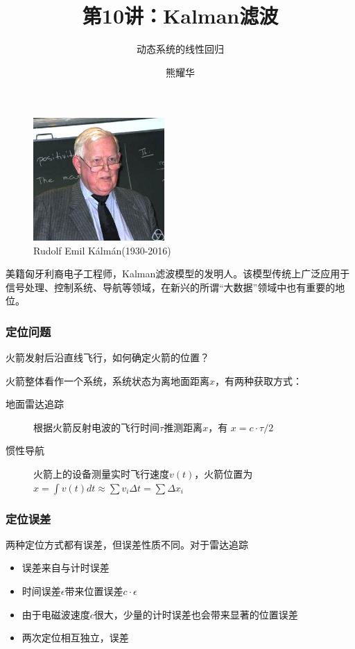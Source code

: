 \documentclass[14pt]{beamer}
\title{第10讲：Kalman滤波}
\subtitle{动态系统的线性回归}
\author{熊耀华}
\institute{交通工程系}
\let\emph\relax %
\begin{document}
\begin{frame}
    \titlepage
\end{frame}

\begin{frame}
  \begin{figure}
    \centering
    \includegraphics[width=5cm]{rudolf_kalman.jpg}
    \caption{Rudolf Emil K\'alm\'an(1930-2016)}
  \end{figure}

  \small 美籍匈牙利裔电子工程师，Kalman滤波模型的发明人。该模型传统上广泛应用于
  信号处理、控制系统、导航等领域，在新兴的所谓“大数据”领域中也有重要的地位。
\end{frame}

\begin{frame}
  \frametitle{定位问题}
  火箭发射后沿直线飞行，如何确定火箭的位置？

  {\small 火箭整体看作一个系统，系统状态为离地面距离$x$，有两种获取方式：}
  \begin{description}
    \item[地面雷达追踪] 根据火箭反射电波的飞行时间$\tau$推测距离$x$，有
    $x=c\cdot \tau/2$  
    \item[惯性导航] 火箭上的设备测量实时飞行速度$v(t)$，火箭位置为
    $x=\int v(t)dt\approx\sum v_i\Delta t=\sum \Delta x_i$
  \end{description}
\end{frame}

\begin{frame}
  \frametitle{定位误差}
  两种定位方式都有误差，但误差性质不同。对于雷达追踪
  \begin{itemize}
    \item 误差来自与计时误差
    \item 时间误差$\epsilon$带来位置误差$c\cdot\epsilon$
    \item 由于电磁波速度$c$很大，少量的计时误差也会带来显著的位置误差
    \item 两次定位相互独立，误差\emph{不累积}
  \end{itemize}
\end{frame}
\end{document}
